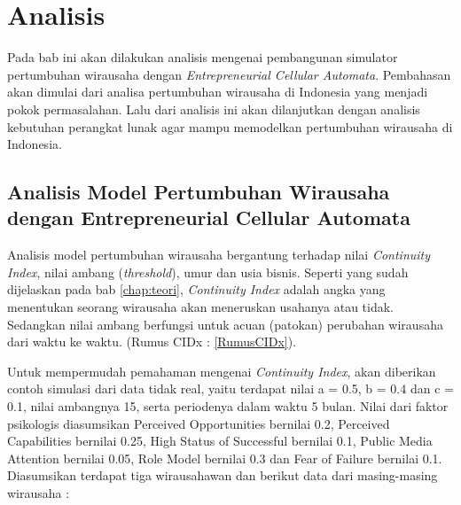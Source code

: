 \chapter{Analisis}
\label{chap:analisis}


Pada bab ini akan dilakukan analisis mengenai pembangunan simulator pertumbuhan wirausaha dengan \textit{Entrepreneurial Cellular Automata}. Pembahasan akan dimulai dari analisa pertumbuhan wirausaha di Indonesia yang menjadi pokok permasalahan. Lalu dari analisis ini akan dilanjutkan dengan analisis kebutuhan perangkat lunak agar mampu memodelkan pertumbuhan wirausaha di Indonesia.


\section{Analisis Model Pertumbuhan Wirausaha dengan Entrepreneurial Cellular Automata}
\label{analisismodelCA}

Analisis model pertumbuhan wirausaha bergantung terhadap nilai \textit{Continuity Index}, nilai ambang (\textit{threshold}), umur dan usia bisnis. Seperti yang sudah dijelaskan pada bab \ref{chap:teori}, \textit{Continuity Index} adalah angka yang menentukan seorang wirausaha akan meneruskan usahanya atau tidak. Sedangkan nilai ambang berfungsi untuk acuan (patokan) perubahan wirausaha dari waktu ke waktu. (Rumus CIDx : \ref{RumusCIDx}).


Untuk mempermudah pemahaman mengenai \textit{Continuity Index}, akan diberikan contoh simulasi dari data tidak real, yaitu terdapat nilai a = 0.5, b = 0.4 dan c = 0.1, nilai ambangnya 15, serta periodenya dalam waktu 5 bulan. Nilai dari faktor psikologis diasumsikan Perceived Opportunities bernilai 0.2, Perceived Capabilities bernilai 0.25, High Status of Successful bernilai 0.1, Public Media Attention bernilai 0.05, Role Model bernilai 0.3 dan Fear of Failure bernilai 0.1. Diasumsikan terdapat tiga wirausahawan dan berikut data dari masing-masing wirausaha :
				
